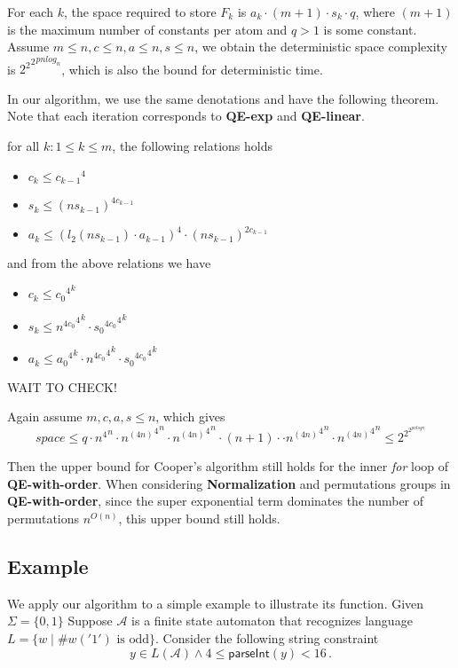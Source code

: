 \documentclass[runningheads]{llncs}
\newcommand{\parseInt}{\textsf{parseInt}}
\begin{document}
For each $k$,
the space required to store $F_k$ 
is $a_k \cdot (m+1) \cdot s_k \cdot q$,
where $(m+1)$ is the maximum number of constants per atom and $q>1$ is some constant. Assume $m\le n, c\le n, a\le n, s\le n$, we obtain the deterministic space complexity is ${{2^2}^2}^{p n log_n}$, which is also the bound for deterministic time.

In our algorithm,
we use the same denotations and have the following theorem. 
Note that each iteration corresponds to \textbf{QE-exp} and \textbf{QE-linear}.
\begin{theorem}
for all $k: 1\le k\le m$, the following relations holds
\begin{itemize}
    \item $c_k \le {c_{k-1}}^4$
    \item $s_k \le {(n s_{k-1})}^{4c_{k-1}}$
    \item $a_k \le {{(l_2(ns_{k-1})\cdot a_{k-1})}}^4 \cdot {(n s_{k-1})}^{2c_{k-1}}$
\end{itemize}
and from the above relations we have 
\begin{itemize}
    \item $c_k \le {{c_0}^4}^k$
    \item $s_k \le {{{n}^{4c_0}}^4}^k \cdot {{{s_0}^{4c_0}}^4}^k$
    \item $a_k \le {{a_0}^4}^k \cdot 
     {{{n}^{4c_0}}^4}^k
     \cdot {{{s_0}^{4c_0}}^4}^k$
\end{itemize}
\end{theorem}

WAIT TO CHECK!

Again assume $m,c,a,s\le n$, which gives 
$$
\textit{space}\le q \cdot {n^4}^n \cdot {{n^{(4n)}}^4}^n \cdot
{{n^{(4n)}}^4}^n \cdot (n+1) \cdot 
\cdot {{n^{(4n)}}^4}^n \cdot {{n^{(4n)}}^4}^n
\le 2^{2^{2^{p n \textit{log}n}}}
$$

Then the upper bound for Cooper's algorithm still holds for the inner \textit{for} loop of \textbf{QE-with-order}.
When considering \textbf{Normalization} and permutations groups in \textbf{QE-with-order},
since the super exponential term dominates the number of permutations $n^{O(n)}$,
this upper bound still holds.



 
\subsection{Example}

We apply our algorithm to a simple example to 
illustrate its function.
Given $\Sigma = \{0,1\}$
Suppose $\mathcal{A}$ is a finite state automaton
that recognizes language $L = \{ w \mid \#w('1') \text{ is odd}\}$.
Consider the following string constraint
$$y\in L(\mathcal{A})\wedge 4\le  \parseInt(y) < 16\,.$$
\end{document}
